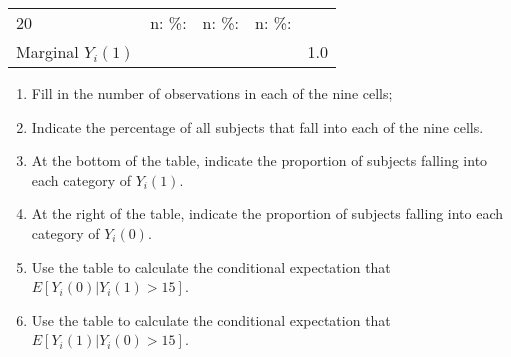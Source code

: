 \documentclass[]{article}
\providecommand{\tightlist}{%
  \setlength{\itemsep}{0pt}\setlength{\parskip}{0pt}}
\begin{document}
\begin{longtable}[]{@{}lllll@{}}
\begin{minipage}[t]{0.19\columnwidth}
20\strut
\end{minipage} & \begin{minipage}[t]{0.06\columnwidth}\raggedright
n: \%:\strut
\end{minipage} & \begin{minipage}[t]{0.06\columnwidth}\raggedright
n: \%:\strut
\end{minipage} & \begin{minipage}[t]{0.06\columnwidth}\raggedright
n: \%:\strut
\end{minipage} & \begin{minipage}[t]{0.32\columnwidth}\raggedright
\strut
\end{minipage}\tabularnewline
\begin{minipage}[t]{0.19\columnwidth}\raggedright
Marginal \(Y_{i}(1)\)\strut
\end{minipage} & \begin{minipage}[t]{0.06\columnwidth}\raggedright
\strut
\end{minipage} & \begin{minipage}[t]{0.06\columnwidth}\raggedright
\strut
\end{minipage} & \begin{minipage}[t]{0.06\columnwidth}\raggedright
\strut
\end{minipage} & \begin{minipage}[t]{0.32\columnwidth}\raggedright
1.0\strut
\end{minipage}\tabularnewline
\bottomrule
\end{longtable}

\begin{enumerate}
\def\labelenumi{\alph{enumi}.}
\tightlist
\item
  Fill in the number of observations in each of the nine cells;
\item
  Indicate the percentage of all subjects that fall into each of the
  nine cells.
\item
  At the bottom of the table, indicate the proportion of subjects
  falling into each category of \(Y_{i}(1)\).
\item
  At the right of the table, indicate the proportion of subjects falling
  into each category of \(Y_{i}(0)\).
\item
  Use the table to calculate the conditional expectation that
  \(E[Y_{i}(0)|Y_{i}(1) > 15]\).
\item
  Use the table to calculate the conditional expectation that
  \(E[Y_{i}(1)|Y_{i}(0) > 15]\).
\end{enumerate}
\end{document}
